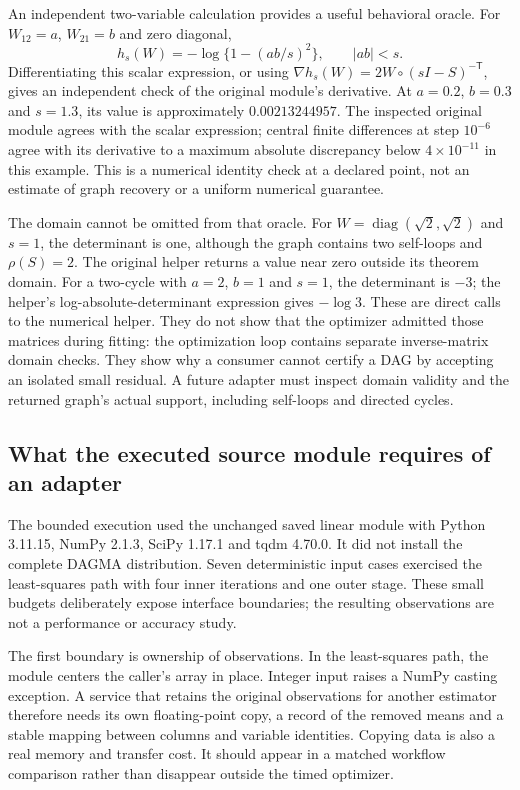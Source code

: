 An independent two-variable calculation provides a useful behavioral oracle.
For $W_{12}=a$, $W_{21}=b$ and zero diagonal,
\begin{equation}
 h_s(W)=-\log\{1-(ab/s)^2\},\qquad |ab|<s.
\end{equation}
Differentiating this scalar expression, or using
$\nabla h_s(W)=2W\circ(sI-S)^{-\mathsf T}$, gives an independent check of
the original module's derivative. At $a=0.2$, $b=0.3$ and $s=1.3$, its value
is approximately $0.00213244957$. The inspected original module agrees with
the scalar expression; central finite differences at step $10^{-6}$ agree
with its derivative to a maximum absolute discrepancy below $4\times10^{-11}$
in this example. This is a numerical identity check at a declared point,
not an estimate of graph recovery or a uniform numerical guarantee.
\citep{exec16_dagma_exact}

The domain cannot be omitted from that oracle. For
$W=\operatorname{diag}(\sqrt{2},\sqrt{2})$ and $s=1$, the determinant is
one, although the graph contains two self-loops and $\rho(S)=2$.
The original helper returns a value near zero outside its theorem domain.
For a two-cycle with $a=2$, $b=1$ and $s=1$, the determinant is $-3$;
the helper's log-absolute-determinant expression gives $-\log3$.
These are direct calls to the numerical helper. They do not show that the
optimizer admitted those matrices during fitting: the optimization loop
contains separate inverse-matrix domain checks. They show why a consumer
cannot certify a DAG by accepting an isolated small residual. A future
adapter must inspect domain validity and the returned graph's actual support,
including self-loops and directed cycles.
\citep{exec16_dagma_primary,exec16_dagma_exact}

\subsection{What the executed source module requires of an adapter}

The bounded execution used the unchanged saved linear module with Python
3.11.15, NumPy 2.1.3, SciPy 1.17.1 and tqdm 4.70.0. It did not install the
complete DAGMA distribution. Seven deterministic input cases exercised the
least-squares path with four inner iterations and one outer stage. These
small budgets deliberately expose interface boundaries; the resulting
observations are not a performance or accuracy study.
\citep{exec16_dagma_runtime}

The first boundary is ownership of observations. In the least-squares path,
the module centers the caller's array in place. Integer input raises a
NumPy casting exception. A service that retains the original observations
for another estimator therefore needs its own floating-point copy, a record
of the removed means and a stable mapping between columns and variable
identities. Copying data is also a real memory and transfer cost. It should
appear in a matched workflow comparison rather than disappear outside the
timed optimizer.
\citep{exec16_dagma_primary,exec16_dagma_runtime}


